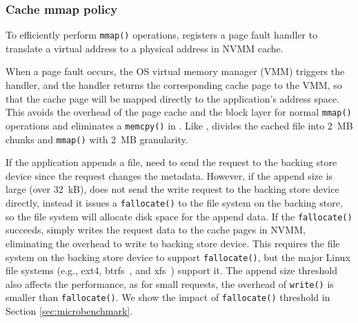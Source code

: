 
\subsubsection{Cache mmap policy}
\label{sec:mmap}


To efficiently perform \texttt{mmap()} operations,
\CChell{} registers a page fault handler to
translate a virtual address to a physical address in NVMM cache.

When a page fault occurs, the OS virtual memory manager (VMM) triggers the
handler, and the handler returns the corresponding cache page
to the VMM, so that the cache page will be mapped directly to the application's
address space.  This avoids the overhead of the page cache and the block layer
for normal \texttt{mmap()} operations and eliminates a \texttt{memcpy()} in \drv{}.
Like \DAChell{}, \CChell{} divides the cached file into 2~MB chunks and
\texttt{mmap()} with 2~MB granularity.


If the application appends a file, \CChell{}
need to send the request to the backing store device since the request changes
the metadata. However, if the append size is large (over 32~kB),
\CChell{} does not send the write request to the backing store device directly,
instead it issues a \texttt{fallocate()} to the file system on the backing
store, so the file system will allocate disk space for the append data.  If the \texttt{fallocate()}
succeeds, \CChell{} simply writes the request data to the cache pages
in NVMM, eliminating the overhead to write to backing store device. This requires
the file system on the backing store device to support \texttt{fallocate()},
but the major Linux file systems (e.g., ext4, btrfs~\cite{btrfs}, and xfs~\cite{xfs}) support it.
The append size threshold also affects the performance, as for small
requests, the overhead of \texttt{write()} is smaller than \texttt{fallocate()}.
We show the impact of \texttt{fallocate()} threshold in Section
\ref{sec:microbenchmark}.

